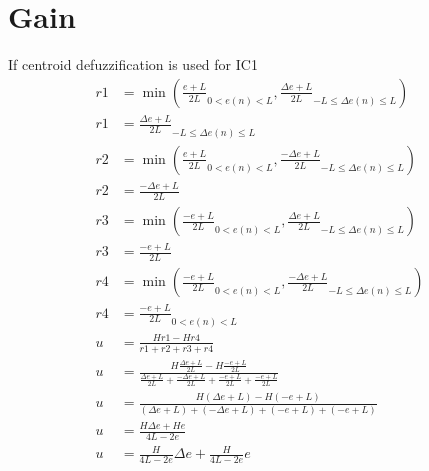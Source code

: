 \section{Gain}
If centroid defuzzification is used for IC1 
\begin{equation}
\begin{split}
    r1&=\min{\left(\frac{e+L}{2L}_{0<e(n)<L},\frac{\Delta e+L}{2L}_{-L\leq\Delta e(n)\leq L}\right)}\\
    r1&=\frac{\Delta e+L}{2L}_{-L\leq\Delta e(n)\leq L}\\
    r2&=\min{\left(\frac{e+L}{2L}_{0<e(n)<L},\frac{-\Delta e+L}{2L}_{-L\leq\Delta e(n)\leq L}\right)}\\
    r2&=\frac{-\Delta e+L}{2L}\\
    r3&=\min{\left(\frac{-e+L}{2L}_{0<e(n)<L},\frac{\Delta e+L}{2L}_{-L\leq\Delta e(n)\leq L}\right)}\\
    r3&=\frac{-e+L}{2L}\\
    r4&=\min{\left(\frac{-e+L}{2L}_{0<e(n)<L},\frac{-\Delta e+L}{2L}_{-L\leq\Delta e(n)\leq L}\right)}\\
    r4&=\frac{-e+L}{2L}_{0<e(n)<L}\\
    u&=\frac{Hr1-Hr4}{r1+r2+r3+r4}\\
    u&=\frac{H\frac{\Delta e+L}{2L}-H\frac{-e+L}{2L}}{\frac{\Delta e+L}{2L}+\frac{-\Delta e+L}{2L}+\frac{-e+L}{2L}+\frac{-e+L}{2L}}\\
    u&=\frac{H(\Delta e+L)-H(-e+L)}{(\Delta e+L)+(-\Delta e+L)+(-e+L)+(-e+L)}\\
    u&=\frac{H\Delta e+He}{4L-2e}\\
    u&=\frac{H}{4L-2e}\Delta e+\frac{H}{4L-2e}e
\end{split}
\end{equation}

\clearpage
